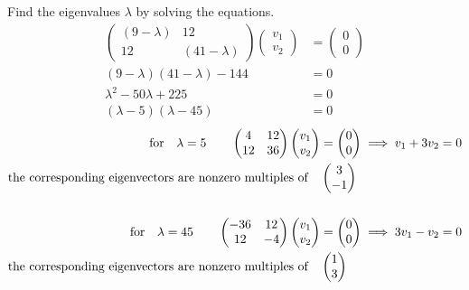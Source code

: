 \documentclass{article}
\begin{document}
Find the eigenvalues $\lambda$ by solving the equations.
\begin{align*}
    \begin{pmatrix}
        (9-\lambda) & 12 \\12 &(41-\lambda)
    \end{pmatrix}\begin{pmatrix}
        v_1 \\v_2
    \end{pmatrix} & =  \begin{pmatrix}
        0 \\0
    \end{pmatrix}    \\
    (9-\lambda)(41-\lambda)-144                          & =                           0    \\
    \lambda^2 -50\lambda+225                             & =                              0 \\
    (\lambda-5)(\lambda-45)                              & =0
\end{align*}
\begin{align*}
    \qfor*\lambda=5\qquad\begin{pmatrix}
        4 & 12 \\12 &36
    \end{pmatrix}\begin{pmatrix}
        v_1 \\v_2
    \end{pmatrix}  & =  \begin{pmatrix}
        0 \\0
    \end{pmatrix}\implies v_1+3v_2=0 \\
    \qq*{the corresponding eigenvectors are nonzero multiples of}              & \begin{pmatrix}
        3 \\ -1
    \end{pmatrix}                       \\                                                                                              \\
    \qfor*\lambda=45\qquad\begin{pmatrix}
        -36 & 12 \\12 &-4
    \end{pmatrix}\begin{pmatrix}
        v_1 \\v_2
    \end{pmatrix} & =  \begin{pmatrix}
        0 \\0
    \end{pmatrix}\implies 3v_1-v_2=0 \\
    \qq*{the corresponding eigenvectors are nonzero multiples of}              & \begin{pmatrix}
        1 \\ 3
    \end{pmatrix}                       \\                                                                                              \\
\end{align*}
\end{document}
